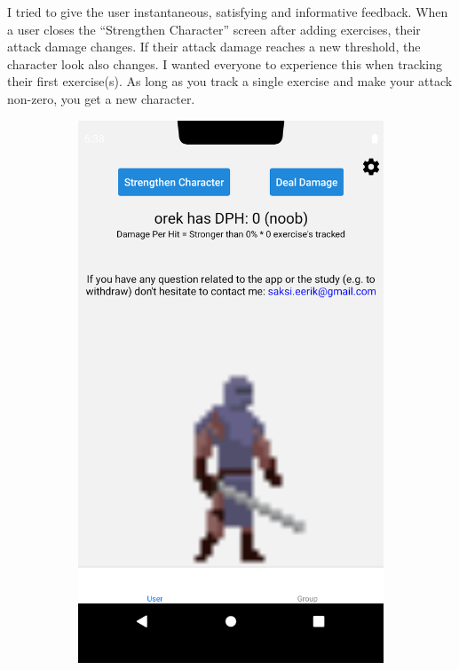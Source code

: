 \documentclass{l4proj}
\begin{document}
\newpage

I tried to give the user instantaneous, satisfying and informative feedback. When a user closes the ``Strengthen Character'' screen after adding exercises, their attack damage changes. If their attack damage reaches a new threshold, the character look also changes. I wanted everyone to experience this when tracking their first exercise(s). As long as you track a single exercise and make your attack non-zero, you get a new character.

\begin{figure}[H]
    \begin{subfigure}{0.45\textwidth}
      \includegraphics[width=\textwidth]{noob_user_page.png}    

\end{subfigure}
\end{figure}
\end{document}
